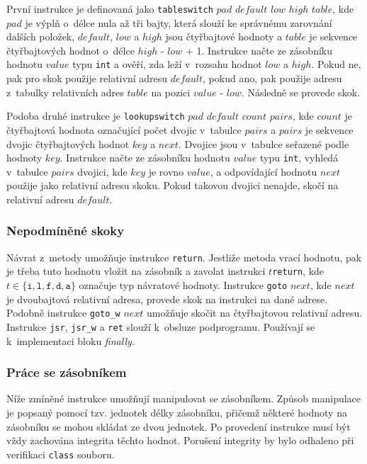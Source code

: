 První instrukce je definovaná jako \texttt{tableswitch} $pad$ $default$ $low$ $high$ $table$, kde $pad$ je výplň o~délce nula až tři bajty, která slouží ke správnému zarovnání dalších položek, $default$, $low$ a $high$ jsou čtyřbajtové hodnoty a $table$ je sekvence čtyřbajtových hodnot o~délce $high$ - $low$ + 1. Instrukce načte ze zásobníku hodnotu $value$ typu \texttt{int} a ověří, zda leží v~rozsahu hodnot $low$ a $high$. Pokud ne, pak pro skok použije relativní adresu $default$, pokud ano, pak použije adresu z~tabulky relativních adres $table$ na pozici $value$ - $low$. Následně se provede skok.

Podoba druhé instrukce je \texttt{lookupswitch} $pad$ $default$ $count$ $pairs$, kde $count$ je čtyřbajtová hodnota označující počet dvojic v~tabulce $pairs$ a $pairs$ je sekvence dvojic čtyřbajtových hodnot $key$ a $next$. Dvojice jsou v~tabulce seřazené podle hodnoty $key$. Instrukce načte ze zásobníku hodnotu $value$ typu \texttt{int}, vyhledá v~tabulce $pairs$ dvojici, kde $key$ je rovno $value$, a odpovídající hodnotu $next$ použije jako relativní adresu skoku. Pokud takovou dvojici nenajde, skočí na relativní adresu $default$.

\subsubsection {Nepodmíněné skoky}

Návrat z~metody umožňuje instrukce \texttt{return}. Jestliže metoda vrací hodnotu, pak je třeba tuto hodnotu vložit na zásobník a zavolat instrukci $t$\texttt{return}, kde $t \in \{ \texttt{i}, \texttt{l}, \texttt{f}, \texttt{d}, \texttt{a} \}$ označuje typ návratové hodnoty. 
Instrukce \texttt{goto} $next$, kde $next$ je dvoubajtová relativní adresa, provede skok na instrukci na dané adrese. Podobně instrukce \texttt{goto\_w} $next$ umožňuje skočit na čtyřbajtovou relativní adresu.
Instrukce \texttt{jsr}, \texttt{jsr\_w} a \texttt{ret} slouží k~obsluze podprogramu. Používají se k~implementaci bloku \textit{finally}.

\subsubsection{Práce se zásobníkem}

Níže zmíněné instrukce umožňují manipulovat se zásobníkem. Způsob manipulace je popsaný pomocí tzv. jednotek délky zásobníku, přičemž některé hodnoty na zásobníku se mohou skládat ze dvou jednotek. Po provedení instrukce musí být vždy zachována integrita těchto hodnot. Porušení integrity by bylo odhaleno při verifikaci \texttt{class} souboru.

